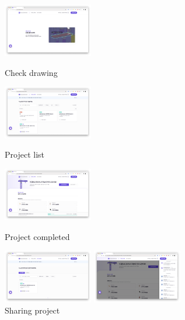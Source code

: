 \begin{itemize}[label=]
\begin{itemize}[label=]
\begin{figure}[!ht]
\begin{fullwidth}
{				            }\qquad
				            \parbox{0.35\textwidth}{
					            \centering
					            \includegraphics[width=0.35\textwidth]{images/builderhub-customer-4.png}
					            \caption*{Check drawing}
				            }
				            \parbox{0.35\textwidth}{
					            \centering
					            \includegraphics[width=0.35\textwidth]{images/builderhub-customer-project-1.png}
					            \caption*{Project list}
				            }\qquad
				            \parbox{0.35\textwidth}{
					            \centering
					            \includegraphics[width=0.35\textwidth]{images/builderhub-customer-project-2.png}
					            \caption*{Project completed}
				            }\qquad
				            \parbox{0.35\textwidth}{
					            \centering
					            \includegraphics[width=0.35\textwidth]{images/builderhub-customer-project-3.png}
					            \caption*{Sharing project}
				            }\qquad
				            \parbox{0.35\textwidth}{
					            \centering
					            \includegraphics[width=0.35\textwidth]{images/builderhub-customer-project-4.png}
}
\end{fullwidth}
\end{figure}
\end{itemize}
\end{itemize}
